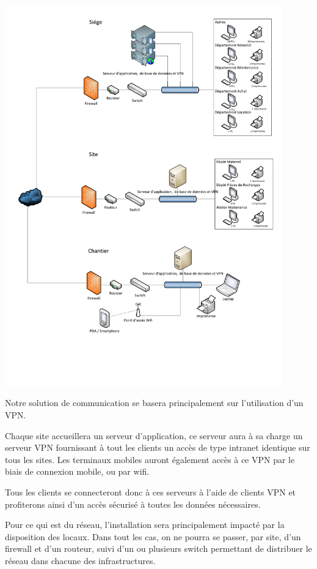 \includegraphics[width=0.9\textwidth]{img/schema-gstp.pdf}

    Notre solution de communication se basera principalement sur l'utilisation d'un VPN.

    Chaque site accueillera un serveur d'application, ce serveur aura à sa charge un serveur VPN fournissant à tout les clients un accès de type intranet identique sur tous les sites.
    Les terminaux mobiles auront également accès à ce VPN par le biais de connexion mobile, ou par wifi.

    Tous les clients se connecteront donc à ces serveurs à l'aide de clients VPN et profiterons ainsi d'un accès sécurisé à toutes les données nécessaires.

    Pour ce qui est du réseau, l'installation sera principalement impacté par la disposition des locaux.
    Dans tout les cas, on ne pourra se passer, par site, d'un firewall et d'un routeur, suivi d'un ou plusieurs switch permettant de distribuer le réseau dans chacune des infrastructures.

